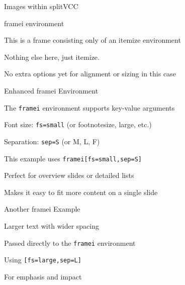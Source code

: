 \documentclass[11pt,compress,t,notes=noshow, xcolor=table]{beamer}
\begin{document}

\begin{frame}{Images within splitVCC}
  
  
  \vfill
  
  
\end{frame}


\begin{framei}{framei environment}
  \item This is a frame consisting only of an itemize environment
  \item Nothing else here, just itemize.
  \item No extra options yet for alignment or sizing in this case
\end{framei}


\begin{framei}[fs=small,sep=S]{Enhanced framei Environment}
  \item The \texttt{framei} environment supports key-value arguments
  \item Font size: \texttt{fs=small} (or footnotesize, large, etc.)
  \item Separation: \texttt{sep=S} (or M, L, F)
  \item This example uses \texttt{framei[fs=small,sep=S]}
  \item Perfect for overview slides or detailed lists
  \item Makes it easy to fit more content on a single slide
\end{framei}


\begin{framei}[fs=large,sep=L]{Another framei Example}
  \item Larger text with wider spacing
  \item Passed directly to the \texttt{framei} environment
  \item Using \texttt{[fs=large,sep=L]}
  \item For emphasis and impact
\end{framei}
\end{document}
